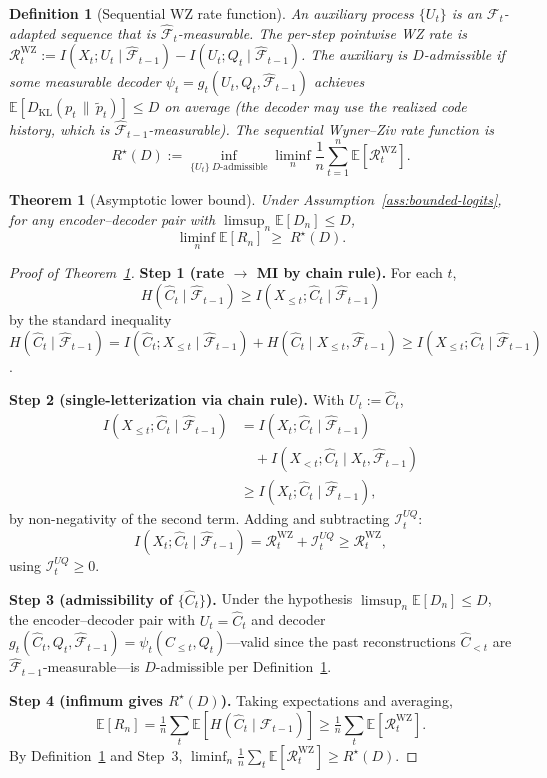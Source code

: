 \documentclass[10pt,a4paper]{amsart}
\newtheorem{definition}{Definition}
\newtheorem{theorem}{Theorem}
\newcommand{\Chat}{\hat{C}}
\newcommand{\E}{\mathbb{E}}
\newcommand{\F}{\mathcal{F}}
\newcommand{\Fhat}{\hat{\F}}
\newcommand{\KL}[2]{D_{\mathrm{KL}}(#1 \,\|\, #2)}
\begin{document}
\begin{definition}[Sequential WZ rate function]
\label{def:Rstar}
An \emph{auxiliary process} $\{U_t\}$ is an $\F_t$-adapted sequence
that is $\Fhat_t$-measurable. The per-step pointwise WZ rate is
$\mathcal{R}_t^{\mathrm{WZ}}
:= I(X_t; U_t \mid \Fhat_{t-1}) - I(U_t; Q_t \mid \Fhat_{t-1})$.
The auxiliary is \emph{$D$-admissible} if some measurable decoder
$\psi_t = g_t(U_t, Q_t, \Fhat_{t-1})$ achieves
$\E[\KL{p_t}{\tilde p_t}] \leq D$ on average (the decoder may use the
realized code history, which is $\Fhat_{t-1}$-measurable). The sequential
Wyner--Ziv rate function is
\[
R^\star(D)
:= \inf_{\{U_t\}\ D\text{-admissible}}
\liminf_{n} \frac{1}{n}\sum_{t=1}^n \E[\mathcal{R}_t^{\mathrm{WZ}}].
\]
\end{definition}

\begin{theorem}[Asymptotic lower bound]\label{thm:asymptotic}
Under Assumption~\ref{ass:bounded-logits}, for any
encoder--decoder pair with $\limsup_n \E[D_n] \leq D$,
\[
\liminf_{n} \E[R_n] \;\geq\; R^\star(D).
\]
\end{theorem}

\begin{proof}[Proof of Theorem~\ref{thm:asymptotic}]
\textbf{Step 1 (rate $\to$ MI by chain rule).}
For each $t$,
\[
H(\Chat_t \mid \Fhat_{t-1})
\geq I(X_{\leq t}; \Chat_t \mid \Fhat_{t-1})
\]
by the standard inequality $H(\Chat_t \mid \Fhat_{t-1})
= I(\Chat_t; X_{\leq t} \mid \Fhat_{t-1})
+ H(\Chat_t \mid X_{\leq t}, \Fhat_{t-1})
\geq I(X_{\leq t}; \Chat_t \mid \Fhat_{t-1})$.

\textbf{Step 2 (single-letterization via chain rule).}
With $U_t := \Chat_t$,
\[
\begin{aligned}
I(X_{\leq t}; \Chat_t \mid \Fhat_{t-1})
&= I(X_t; \Chat_t \mid \Fhat_{t-1}) \\
&\quad + I(X_{<t}; \Chat_t \mid X_t, \Fhat_{t-1}) \\
&\geq I(X_t; \Chat_t \mid \Fhat_{t-1}),
\end{aligned}
\]
by non-negativity of the second term. Adding and subtracting
$\mathcal{I}_t^{UQ}$:
\[
I(X_t; \Chat_t \mid \Fhat_{t-1})
= \mathcal{R}_t^{\mathrm{WZ}} + \mathcal{I}_t^{UQ} \geq \mathcal{R}_t^{\mathrm{WZ}},
\]
using $\mathcal{I}_t^{UQ} \geq 0$.

\textbf{Step 3 (admissibility of $\{\Chat_t\}$).}
Under the hypothesis $\limsup_n \E[D_n] \leq D$, the encoder--decoder
pair with $U_t = \Chat_t$ and decoder
$g_t(\Chat_t, Q_t, \Fhat_{t-1}) = \psi_t(\Chat_{\le t}, Q_t)$---valid
since the past reconstructions $\Chat_{<t}$ are
$\Fhat_{t-1}$-measurable---is $D$-admissible per
Definition~\ref{def:Rstar}.

\textbf{Step 4 (infimum gives $R^\star(D)$).}
Taking expectations and averaging,
\[
\E[R_n] = \tfrac{1}{n}\sum_t \E[H(\Chat_t \mid \Fhat_{t-1})]
\geq \tfrac{1}{n}\sum_t \E[\mathcal{R}_t^{\mathrm{WZ}}].
\]
By Definition~\ref{def:Rstar} and Step~3,
$\liminf_n \tfrac{1}{n}\sum_t \E[\mathcal{R}_t^{\mathrm{WZ}}] \geq R^\star(D)$.
\end{proof}
\end{document}
